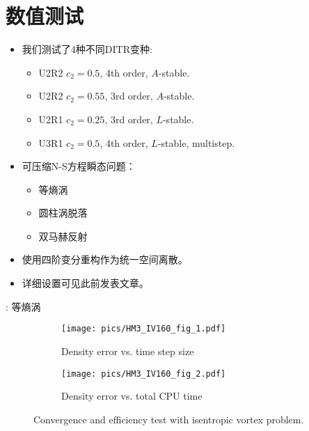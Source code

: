 \documentclass[aspectratio=169,serif]{beamer} %
\begin{document}
\section{数值测试}

\begin{frame}{\secname}
  \begin{itemize}
    \item 我们测试了4种不同DITR变种:
          \begin{itemize}
            \item U2R2 $c_2=0.5$, 4th order, $A$-stable.
            \item U2R2 $c_2=0.55$, 3rd order, $A$-stable.
            \item U2R1 $c_2=0.25$, 3rd order, $L$-stable.
            \item U3R1 $c_2=0.5$, 4th order, $L$-stable, multistep.
          \end{itemize}
    \item 可压缩N-S方程瞬态问题：
          \begin{itemize}
            \item 等熵涡
            \item 圆柱涡脱落
            \item 双马赫反射
          \end{itemize}
    \item 使用四阶变分重构作为统一空间离散。
    \item 详细设置可见此前发表文章\cite{zhou2025high}。
  \end{itemize}
\end{frame}


\begin{frame}{\secname: 等熵涡}
  \scriptsize
  \begin{figure}[htbp]
    \centering
    \begin{subfigure}{0.5\textwidth}
      \texttt{[image: pics/HM3\_IV160\_fig\_1.pdf]}
      \caption[]{Density error vs. time step size }
      \label{sfig:IVTests_Conv}
    \end{subfigure}\hfill
    \begin{subfigure}{0.5\textwidth}
      \texttt{[image: pics/HM3\_IV160\_fig\_2.pdf]}
      \caption[]{Density error vs. total CPU time}
      \label{sfig:IVTests_Eff}
    \end{subfigure}
    \caption[]{Convergence and efficiency test with isentropic vortex problem.}
    \label{fig:IVTests}
  \end{figure}
\end{frame}
\end{document}
